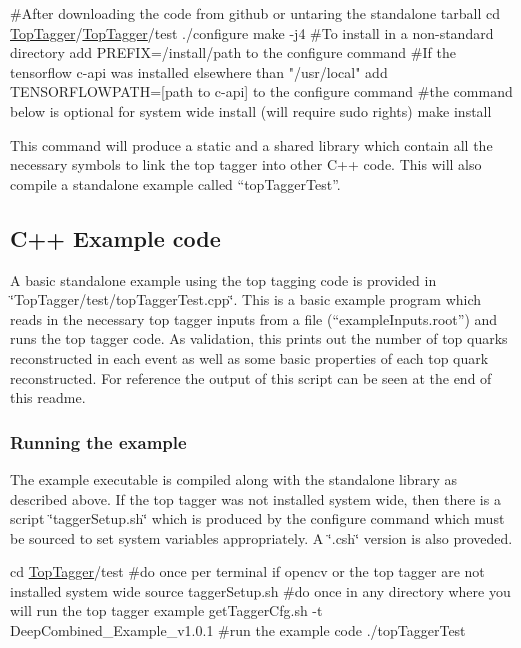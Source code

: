 \begin{DoxyCode}
\textcolor{preprocessor}{#After downloading the code from github or untaring the standalone tarball }
\textcolor{preprocessor}{}cd \hyperlink{classTopTagger}{TopTagger}/\hyperlink{classTopTagger}{TopTagger}/test
./configure
make -j4
\textcolor{preprocessor}{#To install in a non-standard directory add PREFIX=/install/path to the configure command}
\textcolor{preprocessor}{}\textcolor{preprocessor}{#If the tensorflow c-api was installed elsewhere than "/usr/local" add TENSORFLOWPATH=[path to c-api] to
       the configure command}
\textcolor{preprocessor}{}\textcolor{preprocessor}{#the command below is optional for system wide install (will require sudo rights)}
\textcolor{preprocessor}{make install}
\end{DoxyCode}


This command will produce a static and a shared library which contain all the necessary symbols to link the top tagger into other C++ code. This will also compile a standalone example called ``top\-Tagger\-Test''.

\subsection*{C++ Example code}

A basic standalone example using the top tagging code is provided in \char`\"{}\-Top\-Tagger/test/top\-Tagger\-Test.\-cpp\char`\"{}. This is a basic example program which reads in the necessary top tagger inputs from a file (``example\-Inputs.root'') and runs the top tagger code. As validation, this prints out the number of top quarks reconstructed in each event as well as some basic properties of each top quark reconstructed. For reference the output of this script can be seen at the end of this readme.

\subsubsection*{Running the example}

The example executable is compiled along with the standalone library as described above. If the top tagger was not installed system wide, then there is a script \char`\"{}tagger\-Setup.\-sh\char`\"{} which is produced by the configure command which must be sourced to set system variables appropriately. A \char`\"{}.\-csh\char`\"{} version is also proveded.


\begin{DoxyCode}
cd \hyperlink{classTopTagger}{TopTagger}/test
\textcolor{preprocessor}{#do once per terminal if opencv or the top tagger are not installed system wide}
\textcolor{preprocessor}{}source taggerSetup.sh
\textcolor{preprocessor}{#do once in any directory where you will run the top tagger example}
\textcolor{preprocessor}{}getTaggerCfg.sh -t DeepCombined\_Example\_v1.0.1
\textcolor{preprocessor}{#run the example code}
\textcolor{preprocessor}{./topTaggerTest}
\end{DoxyCode}



